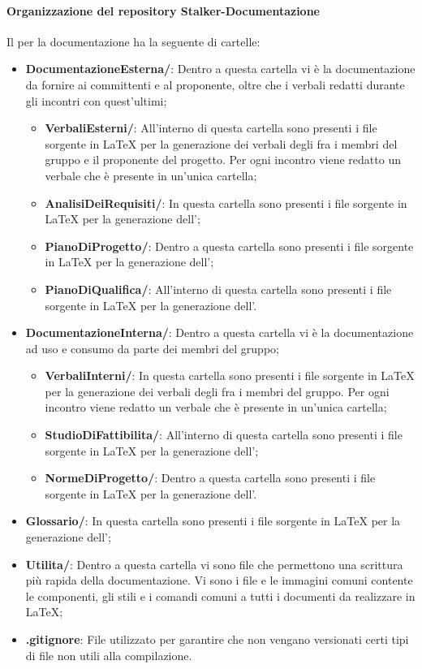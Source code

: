 \paragraph{Organizzazione del repository Stalker-Documentazione}
Il  per la documentazione ha la seguente  di cartelle:
\begin{itemize}
	\item \textbf{DocumentazioneEsterna/}: Dentro a questa cartella vi è la documentazione da fornire ai committenti e al proponente, oltre che i verbali redatti durante gli incontri con quest'ultimi;
	\begin{itemize}
		\item \textbf{VerbaliEsterni/}: All'interno di questa cartella sono presenti i file sorgente in \LaTeX{} per la generazione dei verbali degli  fra i membri del gruppo e il proponente del progetto.
		Per ogni incontro viene redatto un verbale che è presente in un'unica cartella;
		\item \textbf{AnalisiDeiRequisiti/}: In questa cartella sono presenti i file sorgente in \LaTeX{} per la generazione dell'\AdR{};
		\item \textbf{PianoDiProgetto/}: Dentro a questa cartella sono presenti i file sorgente in \LaTeX{} per la generazione dell'\PdP{};
		\item \textbf{PianoDiQualifica/}: All'interno di questa cartella sono presenti i file sorgente in \LaTeX{} per la generazione dell'\PdQ{}.
	\end{itemize}
	\item \textbf{DocumentazioneInterna/}: Dentro a questa cartella vi è la documentazione ad uso e consumo da parte dei membri del gruppo;
	\begin{itemize}
		\item \textbf{VerbaliInterni/}: In questa cartella sono presenti i file sorgente in \LaTeX{} per la generazione dei verbali degli  fra i membri del gruppo.
		Per ogni incontro viene redatto un verbale che è presente in un'unica cartella;
		\item \textbf{StudioDiFattibilita/}: All'interno di questa cartella sono presenti i file sorgente in \LaTeX{} per la generazione dell'\SdF{};
		\item \textbf{NormeDiProgetto/}: Dentro a questa cartella sono presenti i file sorgente in \LaTeX{} per la generazione dell'\NdP{}.
	\end{itemize}	
	\item \textbf{Glossario/}: In questa cartella sono presenti i file sorgente in \LaTeX{} per la generazione dell'\Glossario{};
	\item \textbf{Utilita/}: Dentro a questa cartella vi sono file che permettono una scrittura più rapida della documentazione.
	Vi sono i file e le immagini comuni contente le componenti, gli stili e i comandi comuni a tutti i documenti da realizzare in \LaTeX{};
	\item \textbf{.gitignore}: File utilizzato per garantire che non vengano versionati certi tipi di file non utili alla compilazione.
\end{itemize}

